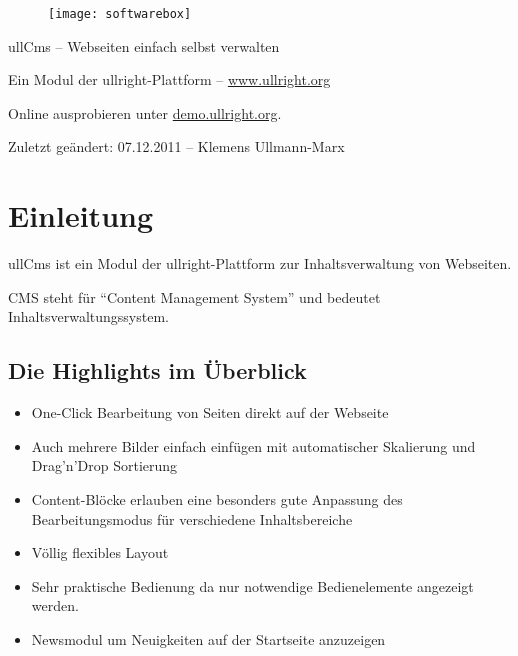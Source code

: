 \documentclass[article, a4paper, oneside, 11pt]{memoir}
\begin{document}
\vspace*{3cm}
\begin{figure}[htp]
\centering
\texttt{[image: softwarebox]}
\end{figure}

\vspace{3cm}

{
\huge
\color{ullblue}
ullCms -- Webseiten einfach selbst verwalten
}

\vspace{1cm}

Ein Modul der ullright-Plattform -- \href{http://www.ullright.org}{www.ullright.org}

Online ausprobieren unter \href{http://demo.ullright.org}{demo.ullright.org}. 

Zuletzt geändert: 07.12.2011 -- Klemens Ullmann-Marx


\clearpage

\pagestyle{plain}

\setcounter{secnumdepth}{2}
\setcounter{tocdepth}{2}
\tableofcontents*

\clearpage

\chapter{Einleitung}
ullCms ist ein Modul der ullright-Plattform zur Inhaltsverwaltung von Webseiten. 

CMS steht für "`Content Management System"' und bedeutet Inhaltsverwaltungssystem.

\section{Die Highlights im Überblick}

\begin{itemize}
\item One-Click Bearbeitung von Seiten direkt auf der Webseite
\item Auch mehrere Bilder einfach einfügen mit automatischer Skalierung und Drag'n'Drop Sortierung
\item Content-Blöcke erlauben eine besonders gute Anpassung des Bearbeitungsmodus für verschiedene Inhaltsbereiche
\item Völlig flexibles Layout 
\item Sehr praktische Bedienung da nur notwendige Bedienelemente angezeigt werden.
\item Newsmodul um Neuigkeiten auf der Startseite anzuzeigen
\end{itemize}
\end{document}
